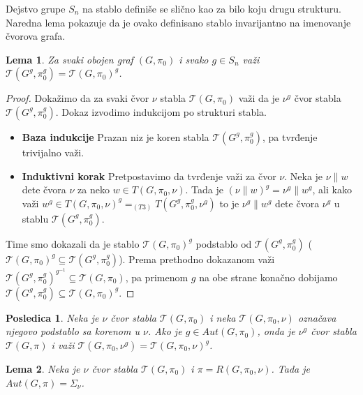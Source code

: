 \documentclass[12pt,oneside]{memoir}
\newtheorem{lemma}{Lema}
\newtheorem{corrolary}{Posledica}
\theoremstyle{definition}
\begin{document}

  Dejstvo grupe $S_n$ na stablo definiše se slično kao za bilo koju drugu
  strukturu. Naredna lema pokazuje da je ovako definisano stablo invarijantno na
  imenovanje čvorova grafa.

  \begin{lemma}
      Za svaki obojen graf $(G, \pi_0)$ i svako $g \in S_n$ važi
      $\mathcal{T}(G^g, \pi_0^g) = \mathcal{T}(G, \pi_0)^g$.
  \end{lemma}

  \begin{proof}
      Dokažimo da za svaki čvor $\nu$ stabla $\mathcal{T}(G, \pi_0)$ važi da je
      $\nu^g$ čvor stabla $\mathcal{T}(G^g, \pi_0^g)$. Dokaz izvodimo indukcijom
      po strukturi stabla.
      \begin{itemize}
     	 \item[] \textbf{Baza indukcije} Prazan niz je koren stabla
     		 $\mathcal{T}(G^g, \pi_0^g)$, pa tvrđenje trivijalno važi.
     	 \item[] \textbf{Induktivni korak} Pretpostavimo da tvrđenje važi za
     		 čvor $\nu$. Neka je $\nu \| w$ dete čvora $\nu$ za neko $w \in
     		 T(G, \pi_0, \nu)$. Tada je $(\nu \| w)^g = \nu^g \| w^g$, ali kako
     		 važi $w^g \in T(G, \pi_0, \nu)^g =_{(T3)} T(G^g, \pi_0^g, \nu^g)$
     		 to je $\nu^g \| w^g$ dete čvora $\nu^g$ u stablu $\mathcal{T}(G^g,
     		 \pi_0^g)$.
      \end{itemize}
      Time smo dokazali da je stablo $\mathcal{T}(G, \pi_0)^g$ podstablo od
      $\mathcal{T}(G^g, \pi_0^g)$ ($\mathcal{T}(G, \pi_0)^g \subseteq
      \mathcal{T}(G^g, \pi_0^g)$). Prema prethodno dokazanom važi
      $\mathcal{T}(G^g, \pi_0^g)^{g^{-1}} \subseteq \mathcal{T}(G, \pi_0)$, pa
      primenom $g$ na obe strane konačno dobijamo $\mathcal{T}(G^g, \pi_0^g)
      \subseteq \mathcal{T}(G, \pi_0)^g$.
  \end{proof}

  \begin{corrolary}
      Neka je $\nu$ čvor stabla $\mathcal{T}(G, \pi_0)$ i neka $\mathcal{T}(G,
      \pi_0, \nu)$ označava njegovo podstablo sa korenom u $\nu$. Ako je $g
      \in Aut(G, \pi_0)$, onda je $\nu^g$ čvor stabla $\mathcal{T}(G, \pi)$ i
      važi $\mathcal{T}(G, \pi_0, \nu^g) = \mathcal{T}(G, \pi_0, \nu)^g$.
  \end{corrolary}

  \begin{lemma}
      Neka je $\nu$ čvor stabla $\mathcal{T}(G, \pi_0)$ i $\pi = R(G, \pi_0,
      \nu)$. Tada je $Aut(G, \pi) = \Sigma_\nu$.
  \end{lemma}
\end{document}
